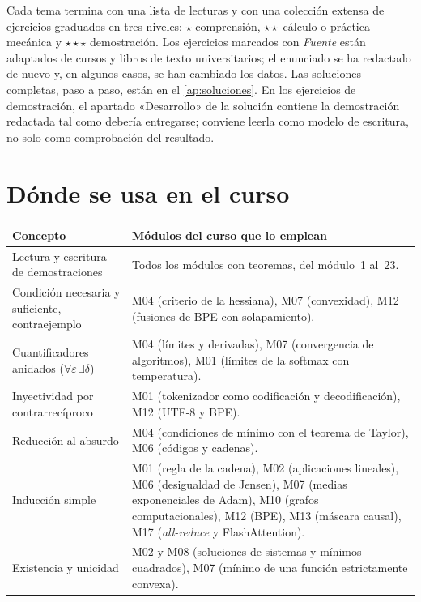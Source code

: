 \documentclass[11pt,a4paper,twoside,openany]{book}
\begin{document}
Cada tema termina con una lista de lecturas y con una colección extensa de ejercicios graduados en tres niveles: $\star$ comprensión, $\star\star$ cálculo o práctica mecánica y $\star\star\star$ demostración. Los ejercicios marcados con \emph{Fuente} están adaptados de cursos y libros de texto universitarios; el enunciado se ha redactado de nuevo y, en algunos casos, se han cambiado los datos. Las soluciones completas, paso a paso, están en el \cref{ap:soluciones}. En los ejercicios de demostración, el apartado «Desarrollo» de la solución contiene la demostración redactada tal como debería entregarse; conviene leerla como modelo de escritura, no solo como comprobación del resultado.

\section*{Dónde se usa en el curso}
\begin{center}
\small
\begin{tabularx}{\textwidth}{@{}>{\raggedright\arraybackslash}p{4.6cm}X@{}}
\toprule
Concepto & Módulos del curso que lo emplean \\
\midrule
Lectura y escritura de demostraciones & Todos los módulos con teoremas, del módulo~1 al~23. \\
Condición necesaria y suficiente, contraejemplo & M04 (criterio de la hessiana), M07 (convexidad), M12 (fusiones de BPE con solapamiento). \\
Cuantificadores anidados ($\forall\varepsilon\,\exists\delta$) & M04 (límites y derivadas), M07 (convergencia de algoritmos), M01 (límites de la softmax con temperatura). \\
Inyectividad por contrarrecíproco & M01 (tokenizador como codificación y decodificación), M12 (UTF-8 y BPE). \\
Reducción al absurdo & M04 (condiciones de mínimo con el teorema de Taylor), M06 (códigos y cadenas). \\
Inducción simple & M01 (regla de la cadena), M02 (aplicaciones lineales), M06 (desigualdad de Jensen), M07 (medias exponenciales de Adam), M10 (grafos computacionales), M12 (BPE), M13 (máscara causal), M17 (\emph{all-reduce} y FlashAttention). \\
Existencia y unicidad & M02 y M08 (soluciones de sistemas y mínimos cuadrados), M07 (mínimo de una función estrictamente convexa). \\
\bottomrule
\end{tabularx}
\end{center}
\end{document}

